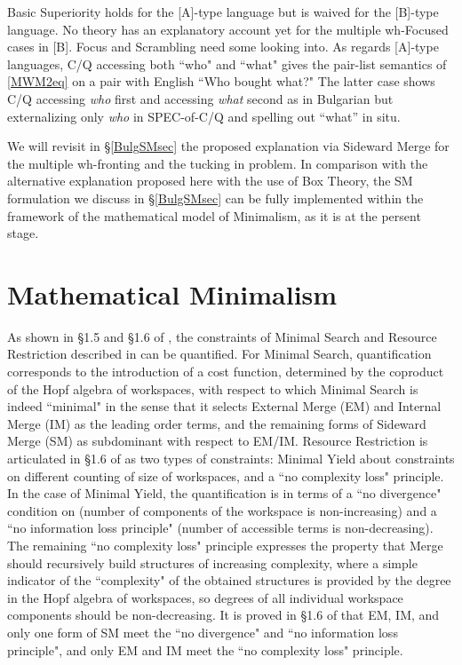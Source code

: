 \documentclass[12pt]{amsart}
\numberwithin{equation}{section}
\begin{document}
\smallskip

Basic Superiority holds for the [A]-type language but is waived for the [B]-type language. 
No theory has an explanatory account yet for the multiple wh-Focused cases in [B]. 
Focus and Scrambling need some looking into. As regards [A]-type languages,
 C/Q accessing both ``who" and ``what" gives the pair-list semantics of \eqref{MWM2eq} 
 on a pair with English ``Who bought what?" The latter case shows C/Q accessing {\em who} 
 first and accessing {\em what} second as in Bulgarian but externalizing only {\em who} 
 in SPEC-of-C/Q and spelling out “what” in situ.
 
 \smallskip
 
 We will revisit in \S \ref{BulgSMsec} the proposed explanation via Sideward Merge
 for the multiple wh-fronting and the tucking in problem. In comparison with the
 alternative explanation proposed here with the use of Box Theory, the SM formulation
 we discuss in \S \ref{BulgSMsec} can be fully implemented within the framework of
 the mathematical model of Minimalism, as it is at the persent stage. 
  
 \smallskip



\section{Mathematical Minimalism} \label{MathMinSec}

As shown in \S 1.5 and \S 1.6 of \cite{MCB}, the constraints of Minimal Search
and Resource Restriction described in \cite{ChomskyElements} can be quantified. For
Minimal Search, quantification corresponds to the introduction of a cost function,
determined by the coproduct of the Hopf algebra of workspaces, with respect to
which Minimal Search is indeed ``minimal" in the sense that it selects External Merge (EM)
and Internal Merge (IM) as the leading order terms, and the remaining forms of
Sideward Merge (SM) as subdominant with respect to EM/IM. Resource Restriction
is articulated in \S 1.6 of \cite{MCB} as two types of constraints: Minimal Yield 
about constraints on different counting of size of workspaces, and a ``no
complexity loss" principle. In the case of Minimal Yield, the quantification is 
in terms of a ``no divergence" condition on (number of components of the
workspace is non-increasing) and a ``no information loss principle" (number of
accessible terms is non-decreasing). The remaining ``no complexity loss"
principle expresses the property that Merge should recursively build 
structures of increasing complexity, where a simple indicator of the ``complexity" 
of the obtained structures is provided by the degree in the Hopf algebra of
workspaces, so degrees of all individual workspace components should be
non-decreasing. It is proved in \S 1.6 of \cite{MCB} that EM, IM, and only
one form of SM meet the ``no divergence" and ``no information loss principle",
and only EM and IM meet the ``no complexity loss" principle.
\end{document}

